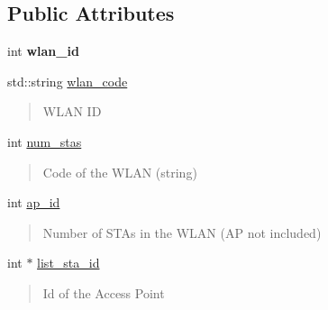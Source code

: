 \subsection*{Public Attributes}
\begin{DoxyCompactItemize}
\item 
\mbox{\label{structWlan_acd1e50de6042019d702a9fdd633165fa}} 
int {\bfseries wlan\+\_\+id}
\item 
\mbox{\label{structWlan_a47755b592c1fe6fb53b990fef19eabbd}} 
std\+::string \hyperlink{structWlan_a47755b592c1fe6fb53b990fef19eabbd}{wlan\+\_\+code}
\begin{DoxyCompactList}\small\item\em \begin{quote}
W\+L\+AN ID \end{quote}
\end{DoxyCompactList}\item 
\mbox{\label{structWlan_a53c3246a5649acd9a764e9b2ef8a76a1}} 
int \hyperlink{structWlan_a53c3246a5649acd9a764e9b2ef8a76a1}{num\+\_\+stas}
\begin{DoxyCompactList}\small\item\em \begin{quote}
Code of the W\+L\+AN (string) \end{quote}
\end{DoxyCompactList}\item 
\mbox{\label{structWlan_a54cceb143026348c8852ea1a01710f72}} 
int \hyperlink{structWlan_a54cceb143026348c8852ea1a01710f72}{ap\+\_\+id}
\begin{DoxyCompactList}\small\item\em \begin{quote}
Number of S\+T\+As in the W\+L\+AN (AP not included) \end{quote}
\end{DoxyCompactList}\item 
\mbox{\label{structWlan_a3535bb787965119676d3b5341800f520}} 
int $\ast$ \hyperlink{structWlan_a3535bb787965119676d3b5341800f520}{list\+\_\+sta\+\_\+id}
\begin{DoxyCompactList}\small\item\em \begin{quote}
Id of the Access Point \end{quote}

\end{DoxyCompactList}
\end{DoxyCompactItemize}
